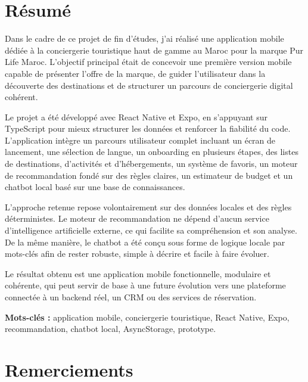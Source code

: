 \documentclass[12pt,a4paper]{report}
\newcommand{\ShortProjectName}{Pur Life Maroc}
\begin{document}
\chapter*{Résumé}

Dans le cadre de ce projet de fin d'études, j'ai réalisé une application mobile dédiée à la conciergerie touristique haut de gamme au Maroc pour la marque \ShortProjectName. L'objectif principal était de concevoir une première version mobile capable de présenter l'offre de la marque, de guider l'utilisateur dans la découverte des destinations et de structurer un parcours de conciergerie digital cohérent.

Le projet a été développé avec React Native et Expo, en s'appuyant sur TypeScript pour mieux structurer les données et renforcer la fiabilité du code. L'application intègre un parcours utilisateur complet incluant un écran de lancement, une sélection de langue, un onboarding en plusieurs étapes, des listes de destinations, d'activités et d'hébergements, un système de favoris, un moteur de recommandation fondé sur des règles claires, un estimateur de budget et un chatbot local basé sur une base de connaissances.

L'approche retenue repose volontairement sur des données locales et des règles déterministes. Le moteur de recommandation ne dépend d'aucun service d'intelligence artificielle externe, ce qui facilite sa compréhension et son analyse. De la même manière, le chatbot a été conçu sous forme de logique locale par mots-clés afin de rester robuste, simple à décrire et facile à faire évoluer.

Le résultat obtenu est une application mobile fonctionnelle, modulaire et cohérente, qui peut servir de base à une future évolution vers une plateforme connectée à un backend réel, un CRM ou des services de réservation.

\vspace{0.5cm}
\noindent \textbf{Mots-clés :} application mobile, conciergerie touristique, React Native, Expo, recommandation, chatbot local, AsyncStorage, prototype.

\chapter*{Remerciements}
\end{document}
